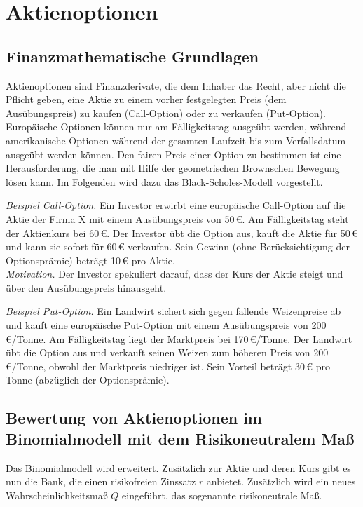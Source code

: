 \section{Aktienoptionen}

\subsection{Finanzmathematische Grundlagen}

Aktienoptionen sind Finanzderivate, die dem Inhaber das Recht, aber nicht die Pflicht geben, 
eine Aktie zu einem vorher festgelegten Preis (dem Ausübungspreis) zu kaufen (Call-Option) 
oder zu verkaufen (Put-Option). Europäische Optionen können nur am Fälligkeitstag ausgeübt 
werden, während amerikanische Optionen während der gesamten Laufzeit bis zum Verfallsdatum 
ausgeübt werden können. Den fairen Preis einer Option zu bestimmen ist eine Herausforderung,
die man mit Hilfe der geometrischen Brownschen Bewegung lösen kann. Im Folgenden wird dazu das Black-Scholes-Modell 
vorgestellt.

\begin{bsp}
\textit{Beispiel Call-Option.} 
Ein Investor erwirbt eine europäische Call-Option auf die Aktie der Firma X mit einem
 Ausübungspreis von 50\,€. Am Fälligkeitstag steht der Aktienkurs bei 60\,€. 
 Der Investor übt die Option aus, kauft die Aktie für 50\,€ und kann 
 sie sofort für 60\,€ verkaufen. Sein Gewinn (ohne Berücksichtigung der Optionsprämie) 
 beträgt 10\,€ pro Aktie.\\
\textit{Motivation.} Der Investor spekuliert darauf, dass der Kurs der Aktie steigt 
und über den Ausübungspreis hinausgeht.

\textit{Beispiel Put-Option.}
Ein Landwirt sichert sich gegen fallende Weizenpreise ab und kauft eine europäische 
Put-Option mit einem Ausübungspreis von 200\,€/Tonne. Am Fälligkeitstag liegt der 
Marktpreis bei 170\,€/Tonne. Der Landwirt übt die Option aus und verkauft seinen 
Weizen zum höheren Preis von 200\,€/Tonne, obwohl der Marktpreis niedriger ist. 
Sein Vorteil beträgt 30\,€ pro Tonne (abzüglich der Optionsprämie).
\end{bsp}
% 
\subsection{Bewertung von Aktienoptionen im Binomialmodell mit dem Risikoneutralem Maß}

Das Binomialmodell wird erweitert. Zusätzlich zur Aktie und deren Kurs gibt es nun die Bank, die einen risikofreien Zinssatz $r$ anbietet.
Zusätzlich wird ein neues Wahrscheinlichkeitsmaß $Q$ eingeführt, das sogenannte risikoneutrale Maß.

